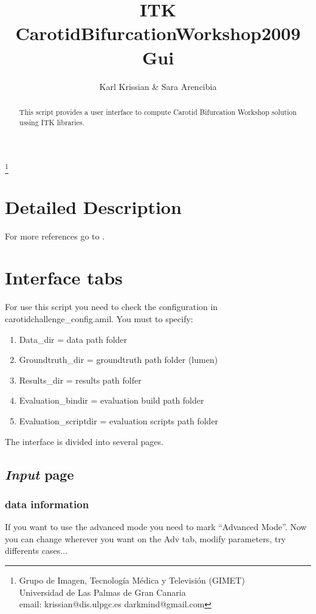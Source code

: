 \documentclass{article}
\begin{document}
\title{ITK CarotidBifurcationWorkshop2009 Gui}
\author{Karl Krissian \& Sara Arencibia}
\thanks{
Grupo de Imagen, Tecnolog\'ia M\'edica y Televisi\'on (GIMET)\\
Universidad de Las Palmas de Gran Canaria\\
email: krissian@dis.ulpgc.es darkmind@gmail.com
}


\maketitle

\begin{abstract}
This script provides a user interface to compute Carotid Bifurcation Workshop solution ussing ITK libraries.
\end{abstract}

\section{Detailed Description}
For more references go to \cite{IJ}.

\section{Interface tabs}
For use this script you need to check the configuration in carotidchallenge\_config.amil. You must to specify:
\begin{enumerate}
  \item Data\_dir = data path folder
  \item Groundtruth\_dir = groundtruth path folder (lumen)
  \item Results\_dir = results path folfer
  \item Evaluation\_bindir = evaluation build path folder
  \item Evaluation\_scriptdir = evaluation scripts path folder
\end{enumerate}

The interface is divided into several pages.

\subsection{\emph{Input} page}
\subsubsection{data information}
If you want to use the advanced mode you need to mark ``Advanced Mode''. Now you can change wherever you want on the Adv tab, modify parameters, try differents cases...
\end{document}
